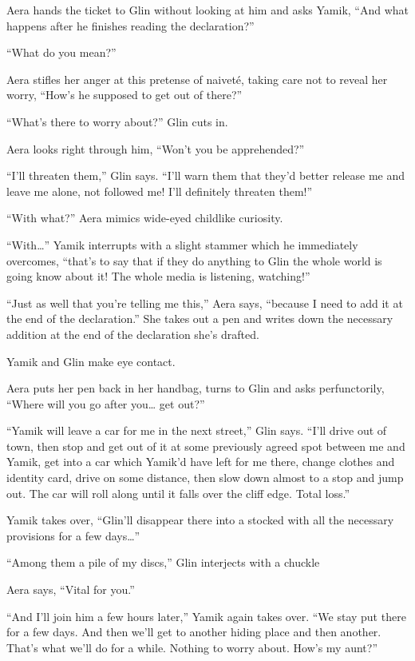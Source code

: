 \documentclass[twoside,11pt]{book}
\begin{document}
Aera hands the ticket to Glin without looking at him and asks Yamik, ``And what happens after he finishes
reading the declaration?''

``What do you mean?''

Aera stifles her anger at this pretense of naivet\'e, taking care not to reveal her worry, ``How's he
supposed to get out of there?''

``What's there to worry about?'' Glin cuts in.

Aera looks right through him, ``Won't you be apprehended?''

``I'll threaten them,'' Glin says. ``I'll warn them that they'd better release me
and leave me alone, not followed me! I'll definitely threaten them!''

``With what?'' Aera mimics wide-eyed childlike curiosity.

``With{\dots}'' Yamik interrupts with a slight stammer which he immediately overcomes,
``that's to say that if they do anything to Glin the whole world is going know about it! The whole media
is listening, watching!''

``Just as well that you're telling me this,'' Aera says, ``because I need to add
it at the end of the declaration.'' She takes out a pen and writes down the necessary addition at the end
of the declaration she's drafted.

Yamik and Glin make eye contact.

Aera puts her pen back in her handbag, turns to Glin and asks perfunctorily, ``Where will you go after
you{\dots} get out?''

``Yamik will leave a car for me in the next street,'' Glin says. ``I'll drive out
of town, then stop and get out of it at some previously agreed spot between me and Yamik, get into a car which Yamik'd
have left for me there, change clothes and identity card, drive on some distance, then slow down almost to a stop and
jump out. The car will roll along until it falls over the cliff edge. Total loss.''

Yamik takes over, ``Glin'll disappear there into a stocked with all the necessary provisions for a few
days{\ldots}''

``Among them a pile of my discs,'' Glin interjects with a chuckle

Aera says, ``Vital for you.''

``And I'll join him a few hours later,'' Yamik again takes over. ``We stay
put there for a few days. And then we'll get to another hiding place and then another. That's what we'll do for a
while. Nothing to worry about. How's my aunt?''
\end{document}
